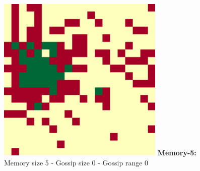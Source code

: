 \documentclass[english]{article}
\begin{document}
\begin{figure}[!h]
{    \includegraphics[width=\textwidth/3]{spatial-memory0+gossip0+range0-C.pdf}
  }
  \textbf{Memory-5:} Memory size 5 - Gossip size 0 - Gossip range 0
\end{figure}
\end{document}
